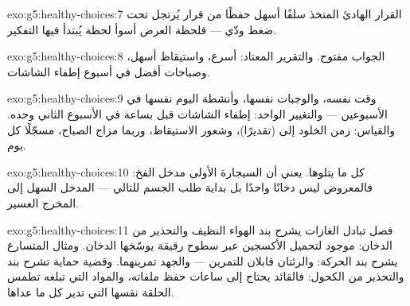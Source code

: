 \begin{solution}{exo:g5:healthy-choices:7}
القرار الهادئ المتخذ سلفًا أسهل حفظًا من قرار يُرتجل تحت ضغط ودّي
--- فلحظة العرض أسوأ لحظة يُبتدأ فيها التفكير.
\end{solution}

\begin{solution}{exo:g5:healthy-choices:8}
الجواب مفتوح. والتقرير المعتاد:  أسرع، واستيقاظ أسهل، وصباحات
أفضل في أسبوع إطفاء الشاشات.
\end{solution}

\begin{solution}{exo:g5:healthy-choices:9}
وقت  نفسه، والوجبات نفسها، وأنشطة اليوم نفسها في الأسبوعين
--- والتغيير الواحد: إطفاء الشاشات قبل  بساعة في الأسبوع
الثاني وحده. والقياس: زمن الخلود إلى  (تقديرًا)، وشعور
الاستيقاظ، وربما مزاج الصباح، مسجّلًا كل يوم.
\end{solution}

\begin{solution}{exo:g5:healthy-choices:10}
كل ما يتلوها.  يعني أن السيجارة الأولى مدخل الفخ: فالمعروض
ليس دخانًا واحدًا بل بداية طلب الجسم للتالي --- المدخل السهل إلى
المخرج العسير.
\end{solution}

\begin{solution}{exo:g5:healthy-choices:11}
فصل تبادل الغازات يشرح بند الهواء النظيف والتحذير من الدخان:
 موجود لتحميل الأكسجين عبر سطوح رقيقة يوسّخها الدخان. ومثال
 المتسارع يشرح بند الحركة:  والرئتان قابلان للتمرين ---
والجهد تمرينهما. وقضية حماية  تشرح بند  والتحذير من
الكحول: فالقائد يحتاج إلى ساعات حفظ ملفاته، والمواد التي تبلغه
تطمس الحلقة نفسها التي تدير كل ما عداها.
\end{solution}
